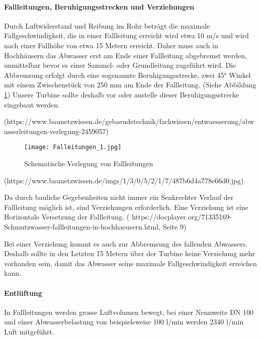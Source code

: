 \paragraph{Fallleitungen, Beruhigungsstrecken und Verziehungen}

Durch Luftwiderstand und Reibung im Rohr beträgt die maximale Fallgeschwindigkeit, die in einer Fallleitung erreicht wird etwa 10 m/s und wird nach einer Fallhöhe von etwa 15 Metern erreicht. Daher muss auch in Hochhäusern das Abwasser erst am Ende einer Fallleitung abgebremst werden, unmittelbar bevor es einer Sammel- oder Grundleitung zugeführt wird. Die Abbremsung erfolgt durch eine sogenannte Beruhigungsstrecke, zwei 45° Winkel mit einem Zwischenstück von 250 mm am Ende der Fallleitung. (Siehe Abbildung \ref{fig:Falleitungen}) Unsere Turbine sollte deshalb vor oder anstelle dieser Beruhigungsstrecke eingebaut werden.

(https://www.baunetzwissen.de/gebaeudetechnik/fachwissen/entwaesserung/abwasserleitungen-verlegung-2459057)



\begin{figure}[h]
	\centering
	\texttt{[image: Falleitungen\_1.jpg]}
	\caption{Schematische Verlegung von Fallleitungen}
	\label{fig:Falleitungen}
\end{figure}



(https://www.baunetzwissen.de/imgs/1/3/0/5/2/1/7/487b6d4a778e66d0.jpg)



Da durch bauliche Gegebenheiten nicht immer ein Senkrechter Verlauf der Fallleitung möglich ist, sind Verziehungen erforderlich. Eine Verziehung ist eine Horizontale Versetzung der Fallleitung. ( https://docplayer.org/71335169-Schmutzwasser-fallleitungen-in-hochhaeusern.html, Seite 9)

Bei einer Verziehung kommt es auch zur Abbremsung des fallenden Abwassers. Deshalb sollte in den Letzten 15 Metern über der Turbine keine Verziehung mehr vorhanden sein, damit das Abwasser seine maximale Fallgeschwindigkeit erreichen kann.



\paragraph{Entlüftung}

In Fallleitungen werden grosse Luftvolumen bewegt, bei einer Nennweite DN 100 und einer Abwasserbelastung von beispielsweise 100 l/min werden 2340 l/min Luft mitgeführt.





